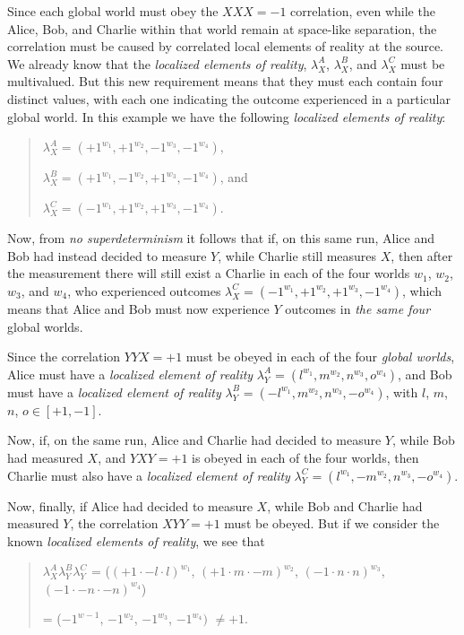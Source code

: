 \documentclass[12pt]{article}
\begin{document}
Since each global world must obey the $XXX = -1$ correlation, even while the Alice, Bob, and Charlie within that world remain
at space-like separation, the correlation must be caused by correlated local elements of reality at the source. We already know that the \textit{localized elements of reality}, $\lambda_X^A$, $\lambda_X^B$, and $\lambda_X^C$ must be multivalued. But this new requirement means that they must each contain four distinct
values, with each one indicating the outcome experienced in a particular global world. In this example we have the following \textit{localized elements of reality}:

\begin{quote}
$\lambda_X^A = (+1^{w_1}, +1^{w_2}, -1^{w_3}, -1^{w_4})$, 

$\lambda_X^B = (+1^{w_1}, -1^{w_2}, +1^{w_3}, -1^{w_4})$, and

$\lambda_X^C = (-1^{w_1}, +1^{w_2}, +1^{w_3}, -1^{w_4})$.
\end{quote}

Now, from \textit{no superdeterminism} it follows that if, on this same run, Alice and Bob had instead decided to
measure $Y$, while Charlie still measures $X$, then after the measurement there will still exist a Charlie in each of the
four worlds $w_1$, $w_2$, $w_3$, and $w_4$, who experienced outcomes $\lambda_X^C = (-1^{w_1}, +1^{w_2}, +1^{w_3}, -1^{w_4})$, which means that Alice
and Bob must now experience $Y$ outcomes in \textit{the same four} global worlds.

Since the correlation $YYX = +1$ must be obeyed in each of the four \textit{global worlds}, Alice must have a \textit{localized element of reality} $\lambda_Y^A
= (l^{w_1}, m^{w_2}, n^{w_3}, o^{w_4})$, and Bob must have a \textit{localized element of reality} $\lambda_Y^B = (-l^{w_1}, m^{w_2}, n^{w_3}, -o^{w_4})$, with $l$, $m$, $n$, $o \in [+1,-1]$.

Now, if, on the same run, Alice and Charlie had decided to measure $Y$, while Bob had measured $X$, and $YXY = +1$ is obeyed in each of the four worlds, then Charlie must also have a \textit{localized element of reality} $\lambda_Y^C = (l^{w_1}, -m^{w_2}, n^{w_3}, -o^{w_4})$.

Now, finally, if Alice had decided to measure $X$, while Bob and Charlie had measured $Y$, the correlation $XYY = +1$ must be obeyed. But if we consider the known \textit{localized elements of reality}, we see that

\begin{quote}
$\lambda_X^A \lambda_Y^B \lambda_Y^C$ = ($ (+1 \cdot -l \cdot l)^{w_1}$, $(+1 \cdot m \cdot -m)^{w_2}$, $(-1 \cdot n \cdot n)^{w_3}$, $(-1 \cdot -n \cdot -n)^{w_4}$) 

= ($-1^{w-1}$, $-1^{w_2}$, $-1^{w_3}$, $-1^{w_4})$ $\neq +1$.
\end{quote}
\end{document}
